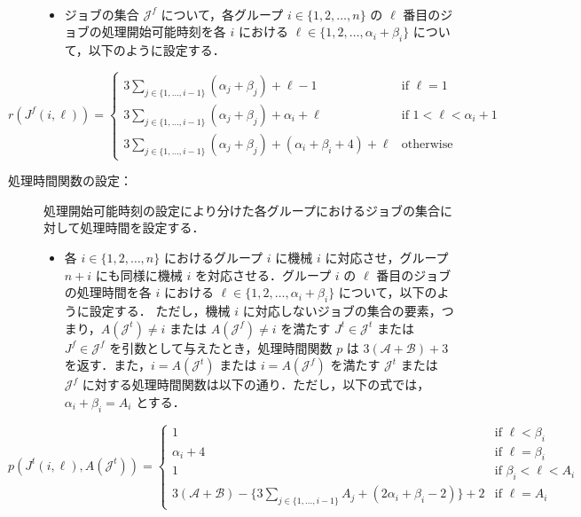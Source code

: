 \documentclass[12pt]{optlab-bachelor}
\begin{document}
\begin{description}
  \item[]~
  \begin{itemize}
    \item ジョブの集合 $\mathcal{J}^f$ について，各グループ $i \in \{1,2,\ldots, n\}$ の $\ell$ 番目のジョブの処理開始可能時刻を各 $i$ における $\ell \in \{1,2,\ldots,\alpha_i + \beta_i\}$ について，以下のように設定する．
  \end{itemize}
\end{description}
\begin{displaymath}
  r(J^f(i,\ell)) =
  \left\{ \begin{array}{lll} 3 \displaystyle \sum_{j \in \{1,\ldots,i
  - 1\}}(\alpha_j + \beta_j) + \ell - 1 & \text{if } \ell = 1
  \\ 3\displaystyle \sum_{j \in \{1,\ldots,i - 1\}}(\alpha_j + \beta_j) + \alpha_i + \ell  &
  \text{if } 1 < \ell < \alpha_i + 1  \\ 3\displaystyle \sum_{j \in \{1,\ldots,i - 1\}}(\alpha_j + \beta_j) + (\alpha_i + \beta_i + 4) + \ell & \text{otherwise} \end{array} \right.
\end{displaymath}
\newpage
\begin{description}
  \item[処理時間関数の設定：] 処理開始可能時刻の設定により分けた各グループにおけるジョブの集合に対して処理時間を設定する．
  \begin{itemize}
    \item 各 $i \in \{1,2,\ldots,n\}$ におけるグループ $i$ に機械 $i$ に対応させ，グループ $n + i$ にも同様に機械 $i$ を対応させる．グループ $i$ の $\ell$ 番目のジョブの処理時間を各 $i$ における $\ell \in \{1,2,\ldots,\alpha_i + \beta_i\}$ について，以下のように設定する．
    ただし，機械 $i$ に対応しないジョブの集合の要素，つまり，$A(\mathcal{J}^t)  \neq i$ または $A(\mathcal{J}^f) \neq i$ を満たす $J^t \in \mathcal{J}^t$ または $J^f \in \mathcal{J}^f$ を引数として与えたとき，処理時間関数 $p$ は $3(\mathcal{A} + \mathcal{B}) + 3$ を返す．また，$i = A(\mathcal{J}^t)$ または $i = A(\mathcal{J}^f)$ を満たす
    $\mathcal{J}^t$ または $\mathcal{J}^f$ に対する処理時間関数は以下の通り．ただし，以下の式では，$\alpha_i + \beta_i = A_i$ とする．
  \end{itemize}
\end{description}
\begin{displaymath}
  p(J^t(i,\ell), A(\mathcal{J}^t)) =
  \left\{ \begin{array}{llll} 1 & \text{if } \ell < \beta_i\\
  \alpha_i + 4 & \text{if } \ell = \beta_i \\ 1 & \text{if } \beta_i < \ell < A_i \\
  3(\mathcal{A} + \mathcal{B}) - \big\{ 3\!\!\!\!\!\displaystyle \sum_{j \in
  \{1,\ldots,i - 1\}}\!\!\!\!\!A_j + (2\alpha_i +
  \beta_i - 2)\big \} + 2 & \text{if } \ell = A_i \end{array} \right.
\end{displaymath}
\end{document}
